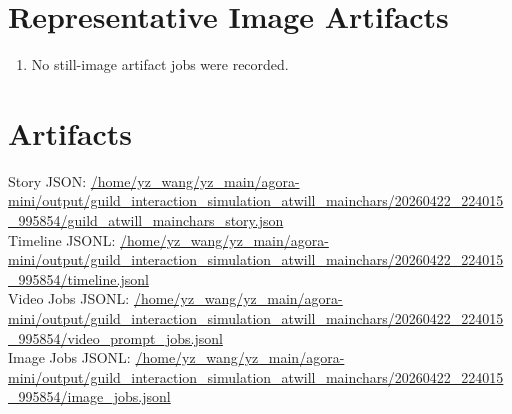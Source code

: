 \documentclass[11pt,a4paper]{article}
\begin{document}
\section{Representative Image Artifacts}
\begin{enumerate}
\item No still-image artifact jobs were recorded.
\end{enumerate}

\section{Artifacts}
Story JSON: \url{/home/yz\_wang/yz\_main/agora-mini/output/guild\_interaction\_simulation\_atwill\_mainchars/20260422\_224015\_995854/guild\_atwill\_mainchars\_story.json}\\
Timeline JSONL: \url{/home/yz\_wang/yz\_main/agora-mini/output/guild\_interaction\_simulation\_atwill\_mainchars/20260422\_224015\_995854/timeline.jsonl}\\
Video Jobs JSONL: \url{/home/yz\_wang/yz\_main/agora-mini/output/guild\_interaction\_simulation\_atwill\_mainchars/20260422\_224015\_995854/video\_prompt\_jobs.jsonl}\\
Image Jobs JSONL: \url{/home/yz\_wang/yz\_main/agora-mini/output/guild\_interaction\_simulation\_atwill\_mainchars/20260422\_224015\_995854/image\_jobs.jsonl}\\
\end{document}
